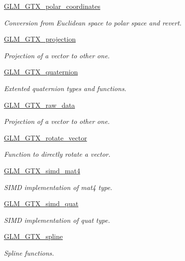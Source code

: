 \begin{DoxyCompactItemize}
\hyperlink{group__gtx__polar__coordinates}{G\-L\-M\-\_\-\-G\-T\-X\-\_\-polar\-\_\-coordinates}
\begin{DoxyCompactList}\small\item\em Conversion from Euclidean space to polar space and revert. \end{DoxyCompactList}\item 
\hyperlink{group__gtx__projection}{G\-L\-M\-\_\-\-G\-T\-X\-\_\-projection}
\begin{DoxyCompactList}\small\item\em Projection of a vector to other one. \end{DoxyCompactList}\item 
\hyperlink{group__gtx__quaternion}{G\-L\-M\-\_\-\-G\-T\-X\-\_\-quaternion}
\begin{DoxyCompactList}\small\item\em Extented quaternion types and functions. \end{DoxyCompactList}\item 
\hyperlink{group__gtx__raw__data}{G\-L\-M\-\_\-\-G\-T\-X\-\_\-raw\-\_\-data}
\begin{DoxyCompactList}\small\item\em Projection of a vector to other one. \end{DoxyCompactList}\item 
\hyperlink{group__gtx__rotate__vector}{G\-L\-M\-\_\-\-G\-T\-X\-\_\-rotate\-\_\-vector}
\begin{DoxyCompactList}\small\item\em Function to directly rotate a vector. \end{DoxyCompactList}\item 
\hyperlink{group__gtx__simd__mat4}{G\-L\-M\-\_\-\-G\-T\-X\-\_\-simd\-\_\-mat4}
\begin{DoxyCompactList}\small\item\em S\-I\-M\-D implementation of mat4 type. \end{DoxyCompactList}\item 
\hyperlink{group__gtx__simd__vec4}{G\-L\-M\-\_\-\-G\-T\-X\-\_\-simd\-\_\-quat}
\begin{DoxyCompactList}\small\item\em S\-I\-M\-D implementation of quat type. \end{DoxyCompactList}\item 
\hyperlink{group__gtx__spline}{G\-L\-M\-\_\-\-G\-T\-X\-\_\-spline}
\begin{DoxyCompactList}\small\item\em Spline functions. \end{DoxyCompactList}\item 

\end{DoxyCompactItemize}
